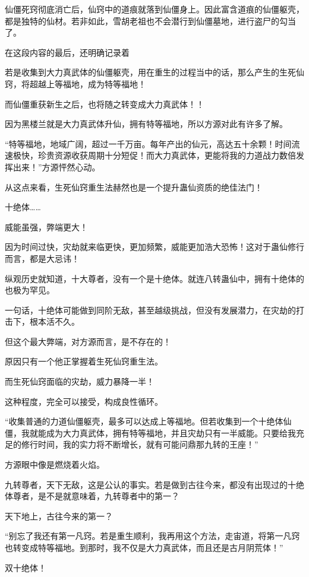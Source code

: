 \begin{this_body}
仙僵死窍彻底消亡后，仙窍中的道痕就落到仙僵身上。因此富含道痕的仙僵躯壳，都是独特的仙材。若非如此，雪胡老祖也不会潜行到仙僵墓地，进行盗尸的勾当了。

在这段内容的最后，还明确记录着

若是收集到大力真武体的仙僵躯壳，用在重生的过程当中的话，那么产生的生死仙窍，将超越上等福地，成为特等福地！

而仙僵重获新生之后，也将随之转变成大力真武体！！

因为黑楼兰就是大力真武体升仙，拥有特等福地，所以方源对此有许多了解。

“特等福地，地域广阔，超过一千万亩。每年产出的仙元，高达五十余颗！时间流速极快，珍贵资源收获周期十分短促！而大力真武体，更能将我的力道战力数倍发挥出来！”方源怦然心动。

从这点来看，生死仙窍重生法赫然也是一个提升蛊仙资质的绝佳法门！

十绝体……

威能虽强，弊端更大！

因为时间过快，灾劫就来临更快，更加频繁，威能更加浩大恐怖！这对于蛊仙修行而言，都是大忌讳！

纵观历史就知道，十大尊者，没有一个是十绝体。就连八转蛊仙中，拥有十绝体的也极为罕见。

一句话，十绝体可能做到同阶无敌，甚至越级挑战，但没有发展潜力，在灾劫的打击下，根本活不久。

但这个最大弊端，对方源而言，是不存在的！

原因只有一个他正掌握着生死仙窍重生法。

而生死仙窍面临的灾劫，威力暴降一半！

这种程度，完全可以接受，构成良性循环。

“收集普通的力道仙僵躯壳，最多可以达成上等福地。但若收集到一个十绝体仙僵，我就能成为大力真武体，拥有特等福地，并且灾劫只有一半威能。只要给我充足的修行时间，我的实力将不断增长，就有可能问鼎那九转的王座！”

方源眼中像是燃烧着火焰。

九转尊者，天下无敌，这是公认的事实。若是做到古往今来，都没有出现过的十绝体尊者，是不是就意味着，九转尊者中的第一？

天下地上，古往今来的第一？

“别忘了我还有第一凡窍。若是重生顺利，我再用这个方法，走宙道，将第一凡窍也转变成特等福地。到那时，我不仅是大力真武体，而且还是古月阴荒体！”

双十绝体！


\end{this_body}
